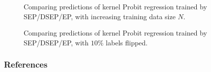 \documentclass{article} %
\begin{document}
\begin{figure}
\centering
\def\svgwidth{1\linewidth}

\caption{Comparing predictions of kernel Probit regression trained by SEP/DSEP/EP, with increasing training data size $N$.}
\label{fig:kernel_increase_n}
\end{figure}

\begin{figure}
\centering
\def\svgwidth{1\linewidth}

\caption{Comparing predictions of kernel Probit regression trained by SEP/DSEP/EP, with $10\%$ labels flipped.}
\label{fig:kernel_flip}
\end{figure}

\newpage
\subsubsection*{References}
\renewcommand{\section}[2]{}
\small


\end{document}
